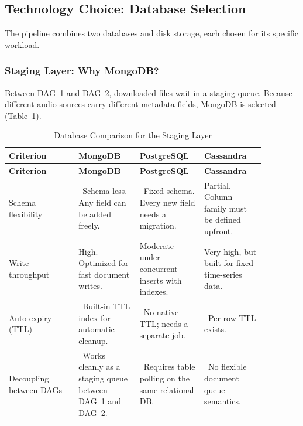\documentclass[a4paper]{article}
\newcommand{\cmark}{\ding{51}}
\newcommand{\xmark}{\ding{55}}
\begin{document}
\subsection{Technology Choice: Database Selection}

The pipeline combines two databases and disk storage, each chosen for its specific workload.

\subsubsection{Staging Layer: Why MongoDB?}

Between DAG~1 and DAG~2, downloaded files wait in a staging queue. Because different audio sources carry different metadata fields, MongoDB is selected (Table~\ref{tab:db_staging}).

\begin{longtable}{@{}
    >{\raggedright\arraybackslash}p{0.24\linewidth}
    >{\raggedright\arraybackslash}p{0.21\linewidth}
    >{\raggedright\arraybackslash}p{0.21\linewidth}
    >{\raggedright\arraybackslash}p{0.21\linewidth}@{}}

    \caption{Database Comparison for the Staging Layer}\label{tab:db_staging} \\
    \toprule
    \textbf{Criterion} & \textbf{MongoDB} & \textbf{PostgreSQL} & \textbf{Cassandra} \\
    \midrule
    \endfirsthead
    \toprule
    \textbf{Criterion} & \textbf{MongoDB} & \textbf{PostgreSQL} & \textbf{Cassandra} \\
    \midrule
    \endhead
    \bottomrule
    \endlastfoot

    Schema flexibility &
    \cmark~Schema-less. Any field can be added freely. &
    \xmark~Fixed schema. Every new field needs a migration. &
    Partial. Column family must be defined upfront. \\
    \addlinespace
    Write throughput &
    High. Optimized for fast document writes. &
    Moderate under concurrent inserts with indexes. &
    Very high, but built for fixed time-series data. \\
    \addlinespace
    Auto-expiry (TTL) &
    \cmark~Built-in TTL index for automatic cleanup. &
    \xmark~No native TTL; needs a separate job. &
    \cmark~Per-row TTL exists. \\
    \addlinespace
    Decoupling between DAGs &
    \cmark~Works cleanly as a staging queue between DAG~1 and DAG~2. &
    \xmark~Requires table polling on the same relational DB. &
    \xmark~No flexible document queue semantics. \\
\end{longtable}
\end{document}
